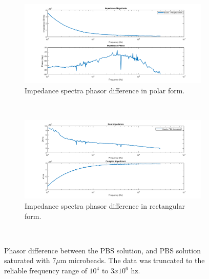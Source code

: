 \begin{figure}[h]
    \centering
    \begin{subfigure}[b]{\textwidth}
        \centering
        \includegraphics[width=\textwidth]{images/IS_data_beads-PBS_truncated_mag_phase.png}
        \caption{Impedance spectra phasor difference in polar form.}
    \end{subfigure}
    \\
    \vspace{0.1 in}
    \begin{subfigure}[b]{\textwidth}
        \centering
        \includegraphics[width=\textwidth]{images/IS_data_beads-PBS_truncated_real_imag.png}
        \caption{Impedance spectra phasor difference in rectangular form.}
    \end{subfigure}
    \\
    \caption[Truncated phasor difference between PBS, and micro-bead saturated PBS.]{Phasor difference between the PBS solution, and PBS solution saturated with 7$\mu$m microbeads. The data was truncated to the reliable frequency range of $10^4$ to $3x10^6$ hz.}
    \label{fig:IS_data_beads_pbs_DI_comp}
\end{figure}


